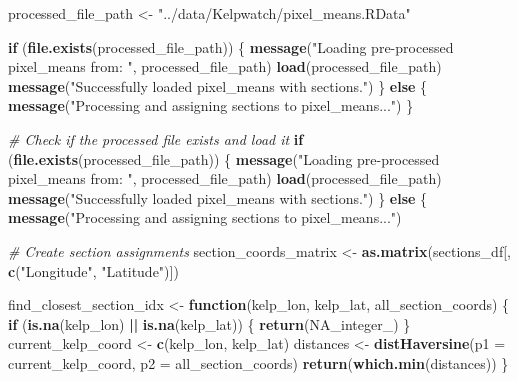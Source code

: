 \documentclass[
  british,
  10pt,
]{article}
\newenvironment{Shaded}{\begin{snugshade}}{\end{snugshade}}
\newcommand{\AttributeTok}[1]{\textcolor[rgb]{0.13,0.29,0.53}{#1}}
\newcommand{\CommentTok}[1]{\textcolor[rgb]{0.56,0.35,0.01}{\textit{#1}}}
\newcommand{\ConstantTok}[1]{\textcolor[rgb]{0.56,0.35,0.01}{#1}}
\newcommand{\ControlFlowTok}[1]{\textcolor[rgb]{0.13,0.29,0.53}{\textbf{#1}}}
\newcommand{\FunctionTok}[1]{\textcolor[rgb]{0.13,0.29,0.53}{\textbf{#1}}}
\newcommand{\NormalTok}[1]{#1}
\newcommand{\OtherTok}[1]{\textcolor[rgb]{0.56,0.35,0.01}{#1}}
\newcommand{\SpecialCharTok}[1]{\textcolor[rgb]{0.81,0.36,0.00}{\textbf{#1}}}
\newcommand{\StringTok}[1]{\textcolor[rgb]{0.31,0.60,0.02}{#1}}
\begin{document}
\begin{Shaded}
\begin{Highlighting}[]
\NormalTok{processed\_file\_path }\OtherTok{\textless{}{-}} \StringTok{"../data/Kelpwatch/pixel\_means.RData"}

\ControlFlowTok{if}\NormalTok{ (}\FunctionTok{file.exists}\NormalTok{(processed\_file\_path)) \{}
  \FunctionTok{message}\NormalTok{(}\StringTok{"Loading pre{-}processed pixel\_means from: "}\NormalTok{, processed\_file\_path)}
  \FunctionTok{load}\NormalTok{(processed\_file\_path)}
  \FunctionTok{message}\NormalTok{(}\StringTok{"Successfully loaded pixel\_means with sections."}\NormalTok{)}
\NormalTok{\} }\ControlFlowTok{else}\NormalTok{ \{}
  \FunctionTok{message}\NormalTok{(}\StringTok{"Processing and assigning sections to pixel\_means..."}\NormalTok{)}
\NormalTok{\}}

\CommentTok{\# Check if the processed file exists and load it}
\ControlFlowTok{if}\NormalTok{ (}\FunctionTok{file.exists}\NormalTok{(processed\_file\_path)) \{}
  \FunctionTok{message}\NormalTok{(}\StringTok{"Loading pre{-}processed pixel\_means from: "}\NormalTok{, processed\_file\_path)}
  \FunctionTok{load}\NormalTok{(processed\_file\_path)}
  \FunctionTok{message}\NormalTok{(}\StringTok{"Successfully loaded pixel\_means with sections."}\NormalTok{)}
\NormalTok{\} }\ControlFlowTok{else}\NormalTok{ \{}
  \FunctionTok{message}\NormalTok{(}\StringTok{"Processing and assigning sections to pixel\_means..."}\NormalTok{)}

  \CommentTok{\# Create section assignments}
\NormalTok{  section\_coords\_matrix }\OtherTok{\textless{}{-}} \FunctionTok{as.matrix}\NormalTok{(sections\_df[, }\FunctionTok{c}\NormalTok{(}\StringTok{"Longitude"}\NormalTok{, }\StringTok{"Latitude"}\NormalTok{)])}

\NormalTok{  find\_closest\_section\_idx }\OtherTok{\textless{}{-}} \ControlFlowTok{function}\NormalTok{(kelp\_lon, kelp\_lat, all\_section\_coords) \{}
    \ControlFlowTok{if}\NormalTok{ (}\FunctionTok{is.na}\NormalTok{(kelp\_lon) }\SpecialCharTok{||} \FunctionTok{is.na}\NormalTok{(kelp\_lat)) \{}
      \FunctionTok{return}\NormalTok{(}\ConstantTok{NA\_integer\_}\NormalTok{)}
\NormalTok{    \}}
\NormalTok{    current\_kelp\_coord }\OtherTok{\textless{}{-}} \FunctionTok{c}\NormalTok{(kelp\_lon, kelp\_lat)}
\NormalTok{    distances }\OtherTok{\textless{}{-}} \FunctionTok{distHaversine}\NormalTok{(}\AttributeTok{p1 =}\NormalTok{ current\_kelp\_coord, }\AttributeTok{p2 =}\NormalTok{ all\_section\_coords)}
    \FunctionTok{return}\NormalTok{(}\FunctionTok{which.min}\NormalTok{(distances))}
\NormalTok{  \}}


\end{Highlighting}
\end{Shaded}
\end{document}
